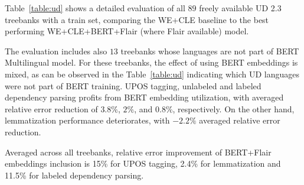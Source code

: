 \documentclass[11pt,a4paper]{article}
\begin{document}
Table~\ref{table:ud} shows a detailed evaluation of all $89$ freely available
UD 2.3 treebanks with a train set, comparing the WE+CLE baseline to the best
performing WE+CLE+BERT+Flair (where Flair available) model.

The evaluation includes also $13$ treebanks whose languages are not part of BERT
Multilingual model. For these treebanks, the effect of using BERT embeddings
is mixed, as can be observed in the Table~\ref{table:ud} indicating which
UD languages were not part of BERT training. UPOS tagging, unlabeled and
labeled dependency parsing profits from BERT embedding utilization, with
averaged relative error reduction of $3.8\%$, $2\%$, and $0.8\%$, respectively.
On the other hand, lemmatization performance deteriorates, with $-2.2\%$
averaged relative error reduction.

Averaged across all
treebanks, relative error improvement of BERT+Flair embeddings inclusion is
15\% for UPOS tagging, 2.4\% for lemmatization and 11.5\% for labeled
dependency parsing.
\end{document}
